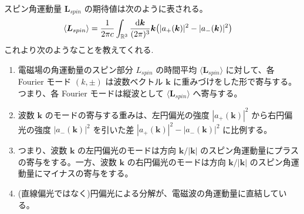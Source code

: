 \documentclass[uplatex,dvipdfmx,a4paper,11pt]{jlreq}
\newcommand{\RR}{\mathbb{R}}
\newcommand{\kk}{\bm{k}}
\newcommand{\LL}{\bm{L}}
\theoremstyle{definition}
\begin{document}
\begin{theorem}
  スピン角運動量 $\LL_{spin}$ の期待値は次のように表される。
  \begin{align}
    \langle\LL_{spin}\rangle & = \frac{1}{2\pi c}\int_{\RR^3}\frac{\dd{\kk}}{(2\pi)^3}\kk\qty(|a_+(\kk)|^2 - |a_-(\kk)|^2)
  \end{align}
  これより次のようなことを教えてくれる.
  \begin{enumerate}
    \item 電磁場の角運動量のスピン部分 $L_{spin}$ の時間平均 $\langle\LL_{spin}\rangle$ に対して、各 Fourier モード $(k, \pm)$ は波数ベクトル $\kk$ に重みづけをした形で寄与する。つまり、各 Fourier モードは縦波として $\langle\LL_{spin}\rangle$ へ寄与する。
    \item 波数 $\kk$ のモードの寄与する重みは、左円偏光の強度 $|a_+(\kk)|^2$ から右円偏光の強度 $|a_-(\kk)|^2$ を引いた差 $|a_+(\kk)|^2 - |a_-(\kk)|^2$ に比例する。
    \item つまり、波数 $\kk$ の左円偏光のモードは方向 $\kk/|\kk|$ のスピン角運動量にプラスの寄与をする。一方、波数 $\kk$ の右円偏光のモードは方向 $\kk/|\kk|$ のスピン角運動量にマイナスの寄与をする。
    \item (直線偏光ではなく)円偏光による分解が、電磁波の角運動量に直結している。
  \end{enumerate}
\end{theorem}
\end{document}

